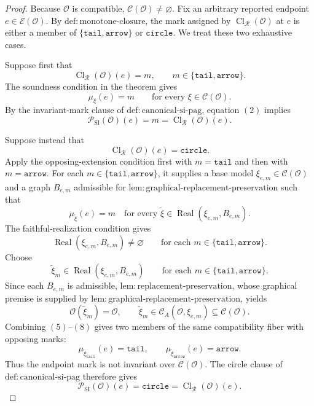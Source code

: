 \documentclass{article}
\begin{document}
\begin{proof}
Because \(\mathcal O\) is compatible, \(\mathcal C(\mathcal O)\neq\varnothing\).  Fix an arbitrary reported endpoint \(e\in\mathcal E(\mathcal O)\).  By \(\mathrm{def:monotone\mbox{-}closure}\), the mark assigned by \(\operatorname{Cl}_{\mathcal R}(\mathcal O)\) at \(e\) is either a member of \(\{\mathtt{tail},\mathtt{arrow}\}\) or \(\mathtt{circle}\).  We treat these two exhaustive cases.

Suppose first that
\[
 \operatorname{Cl}_{\mathcal R}(\mathcal O)(e)=m,
 \qquad m\in\{\mathtt{tail},\mathtt{arrow}\}.
 \tag{1}
\]
The soundness condition in the theorem gives
\[
 \mu_\xi(e)=m
 \qquad\text{for every }\xi\in\mathcal C(\mathcal O).
 \tag{2}
\]
By the invariant-mark clause of \(\mathrm{def:canonical\mbox{-}si\mbox{-}pag}\), equation \((2)\) implies
\[
 \mathcal P_{\mathrm{SI}}(\mathcal O)(e)=m
 =\operatorname{Cl}_{\mathcal R}(\mathcal O)(e).
 \tag{3}
\]

Suppose instead that
\[
 \operatorname{Cl}_{\mathcal R}(\mathcal O)(e)=\mathtt{circle}.
 \tag{4}
\]
Apply the opposing-extension condition first with \(m=\mathtt{tail}\) and then with \(m=\mathtt{arrow}\).  For each \(m\in\{\mathtt{tail},\mathtt{arrow}\}\), it supplies a base model \(\xi_{e,m}\in\mathcal C(\mathcal O)\) and a graph \(B_{e,m}\) admissible for \(\mathrm{lem:graphical\mbox{-}replacement\mbox{-}preservation}\) such that
\[
 \mu_{\widetilde\xi}(e)=m
 \quad\text{for every }
 \widetilde\xi\in\operatorname{Real}(\xi_{e,m},B_{e,m}).
 \tag{5}
\]
The faithful-realization condition gives
\[
 \operatorname{Real}(\xi_{e,m},B_{e,m})\neq\varnothing
 \qquad\text{for each }m\in\{\mathtt{tail},\mathtt{arrow}\}.
 \tag{6}
\]
Choose
\[
 \widetilde\xi_m\in
 \operatorname{Real}(\xi_{e,m},B_{e,m})
 \qquad\text{for each }m\in\{\mathtt{tail},\mathtt{arrow}\}.
 \tag{7}
\]
Since each \(B_{e,m}\) is admissible, \(\mathrm{lem:replacement\mbox{-}preservation}\), whose graphical premise is supplied by \(\mathrm{lem:graphical\mbox{-}replacement\mbox{-}preservation}\), yields
\[
 \mathcal O(\widetilde\xi_m)=\mathcal O,
 \qquad
 \widetilde\xi_m\in\mathcal C_A(\mathcal O,\xi_{e,m})
 \subseteq\mathcal C(\mathcal O).
 \tag{8}
\]
Combining \((5)\)--\((8)\) gives two members of the same compatibility fiber with opposing marks:
\[
 \mu_{\widetilde\xi_{\mathtt{tail}}}(e)=\mathtt{tail},
 \qquad
 \mu_{\widetilde\xi_{\mathtt{arrow}}}(e)=\mathtt{arrow}.
 \tag{9}
\]
Thus the endpoint mark is not invariant over \(\mathcal C(\mathcal O)\).  The circle clause of \(\mathrm{def:canonical\mbox{-}si\mbox{-}pag}\) therefore gives
\[
 \mathcal P_{\mathrm{SI}}(\mathcal O)(e)=\mathtt{circle}
 =\operatorname{Cl}_{\mathcal R}(\mathcal O)(e).
 \tag{10}
\]


\end{proof}
\end{document}
